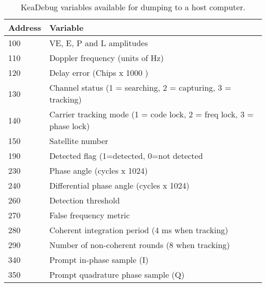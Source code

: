 \begin{table}[!htb]
\centering
\begin{tabular}{|l|l|}
\hline
\rowcolor[HTML]{C0C0C0} 
Address & Variable                                                             \\ \hline
100     & VE, E, P and L amplitudes                                            \\ \hline
\rowcolor[HTML]{EFEFEF} 
110     & Doppler frequency (units of Hz)                                      \\ \hline
120     & Delay error (Chips x 1000 )                                          \\ \hline
\rowcolor[HTML]{EFEFEF} 
130     & Channel status (1 = searching, 2 = capturing, 3 = tracking)          \\ \hline
140     & Carrier tracking mode (1 = code lock, 2 = freq lock, 3 = phase lock) \\ \hline
\rowcolor[HTML]{EFEFEF} 
150     & Satellite number                                                     \\ \hline
190     & Detected flag (1=detected, 0=not detected                            \\ \hline
\rowcolor[HTML]{EFEFEF} 
230     & Phase angle (cycles x 1024)                                          \\ \hline
240     & Differential phase angle (cycles x 1024)                             \\ \hline
\rowcolor[HTML]{EFEFEF} 
260     & Detection threshold                                                  \\ \hline
270     & False frequency metric                                               \\ \hline
\rowcolor[HTML]{EFEFEF} 
280     & Coherent integration period (4 ms when tracking)                     \\ \hline
290     & Number of non-coherent rounds (8 when tracking)                      \\ \hline
\rowcolor[HTML]{EFEFEF} 
340     & Prompt in-phase sample (I)                                           \\ \hline
350     & Prompt quadrature phase sample (Q)                                   \\ \hline
\end{tabular}
\caption{KeaDebug variables available for dumping to a host computer.}
\label{tab:KeaDebugKey}
\end{table}

